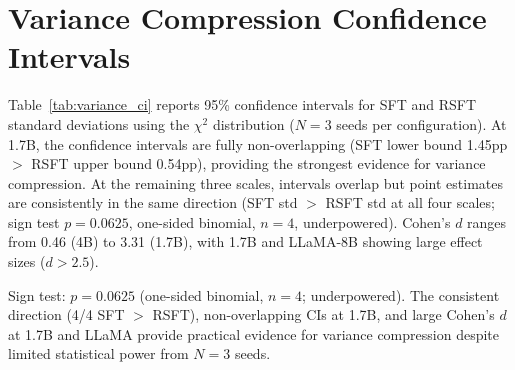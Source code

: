 \section{Variance Compression Confidence Intervals}
\label{sec:variance_ci}

Table~\ref{tab:variance_ci} reports 95\% confidence intervals for SFT and RSFT standard deviations using the $\chi^2$ distribution ($N{=}3$ seeds per configuration). At 1.7B, the confidence intervals are fully non-overlapping (SFT lower bound 1.45pp $>$ RSFT upper bound 0.54pp), providing the strongest evidence for variance compression. At the remaining three scales, intervals overlap but point estimates are consistently in the same direction (SFT std $>$ RSFT std at all four scales; sign test $p = 0.0625$, one-sided binomial, $n = 4$, underpowered). Cohen's $d$ ranges from 0.46 (4B) to 3.31 (1.7B), with 1.7B and LLaMA-8B showing large effect sizes ($d > 2.5$).

\begin{table}[t]
\centering
\caption{95\% confidence intervals for training variance ($\chi^2$ method, $N{=}3$ seeds). Compression is the ratio of SFT to RSFT point estimates (unrounded).}
\label{tab:variance_ci}
\small
{}
\vspace{-2mm}
{\raggedright\footnotesize Sign test: $p = 0.0625$ (one-sided binomial, $n = 4$; underpowered). The consistent direction (4/4 SFT $>$ RSFT), non-overlapping CIs at 1.7B, and large Cohen's $d$ at 1.7B and LLaMA provide practical evidence for variance compression despite limited statistical power from $N{=}3$ seeds.\par}
\end{table}


